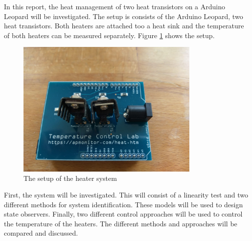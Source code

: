 In this report, the heat management of two heat transistors on a Arduino Leopard will be investigated. The setup is \cite{APMonitor} consists of the Arduino Leopard, two heat transistors. Both heaters are attached too a heat sink and  the temperature of both heaters can be measured separately. Figure \ref{fig:setup} shows the setup.
\begin{figure}[h]
    \centering
    \includegraphics[width = 0.8\textwidth]{Latex/images/Introduction/Setup.jpeg}
    \caption{The setup of the heater system}
    \label{fig:setup}
\end{figure}
First, the system will be investigated. This will consist of a linearity test and two different methods for system identification. These models will be used to design state observers. Finally, two different control approaches will be used to control the temperature of the heaters. The different methods and approaches will be compared and discussed.